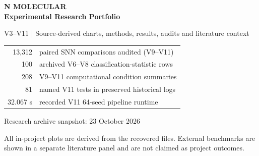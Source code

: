 \documentclass[11pt,a4paper]{article}
\begin{document}
\begin{titlepage}
\centering\vspace*{24mm}
{\Huge\bfseries\color{ink} N MOLECULAR\\[5pt] Experimental Research Portfolio\par}
\vspace{8mm}
{\Large V3--V11 | Source-derived charts, methods, results, audits and literature context\par}
\vspace{22mm}
\begin{tabular}{rl}
13,312 & paired SNN comparisons audited (V9--V11)\\
100 & archived V6--V8 classification-statistic rows\\
208 & V9--V11 computational condition summaries\\
81 & named V11 tests in preserved historical logs\\
32.067 s & recorded V11 64-seed pipeline runtime
\end{tabular}
\vfill
{\large Research archive snapshot: 23 October 2026}\par
\vspace{4mm}
{\small All in-project plots are derived from the recovered files. External benchmarks are shown in a separate literature panel and are not claimed as project outcomes.}\par
\end{titlepage}
\tableofcontents\clearpage
\end{document}
